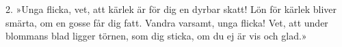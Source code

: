 2.  »Unga flicka, vet, att kärlek
    är för dig en dyrbar skatt!
    Lön för kärlek bliver smärta,
    om en gosse får dig fatt.
    Vandra varsamt, unga flicka!
    Vet, att under blommans blad
    ligger törnen, som dig sticka,
    om du ej är vis och glad.»
